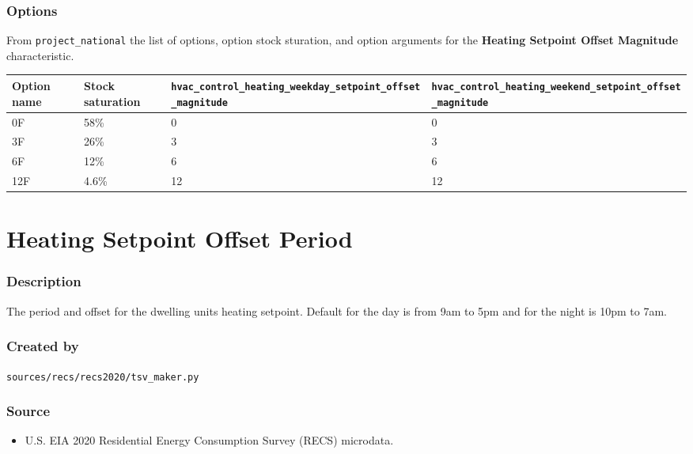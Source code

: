 \subsubsection{Options}\label{options-89}

From \texttt{project\_national} the list of options, option stock
sturation, and option arguments for the \textbf{Heating Setpoint Offset
Magnitude} characteristic.

\begin{longtable}[]{@{}llll@{}}
\toprule\noalign{}
Option name & Stock saturation &
\texttt{hvac\_control\_heating\_weekday\_setpoint\_offset\_magnitude} &
\texttt{hvac\_control\_heating\_weekend\_setpoint\_offset\_magnitude} \\
\midrule\noalign{}
\endhead
\bottomrule\noalign{}
\endlastfoot
0F & 58\% & 0 & 0 \\
3F & 26\% & 3 & 3 \\
6F & 12\% & 6 & 6 \\
12F & 4.6\% & 12 & 12 \\
\end{longtable}

\section{Heating Setpoint Offset
Period}\label{heating_setpoint_offset_period}

\subsubsection{Description}\label{description-90}

The period and offset for the dwelling unit\textquotesingle s heating
setpoint. Default for the day is from 9am to 5pm and for the night is
10pm to 7am.

\subsubsection{Created by}\label{created-by-90}

\texttt{sources/recs/recs2020/tsv\_maker.py}

\subsubsection{Source}\label{source-89}

\begin{itemize}
 
\item
  U.S. EIA 2020 Residential Energy Consumption Survey (RECS) microdata.
\end{itemize}

